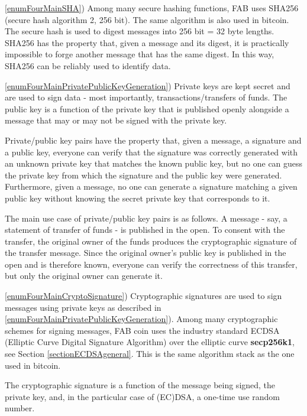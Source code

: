 \documentclass{article}
\newcommand{\secpTwoFiveSixKone}{{\bf secp256k1}}
\begin{document}
\noindent\ref{enumFourMainSHA}) Among many secure hashing functions, FAB uses SHA256 (secure hash algorithm 2, 256 bit). The same algorithm is also used in bitcoin. The secure hash is used to digest messages into 256 bit = 32 byte lengths. SHA256 has the property that, given a message and its digest, it is practically impossible to forge another message that has the same digest. 
In this way, SHA256 can be reliably used to identify data. 

\noindent\ref{enumFourMainPrivatePublicKeyGeneration}) Private keys are kept secret and are used to sign data - most importantly, transactions/transfers of funds. The public key is a function of the private key that is published openly alongside a message that may or may not be signed with the private key. 

Private/public key pairs have the property that, given a message, a signature and a public key, everyone can verify that the signature was correctly generated with an unknown private key that matches the known public key, but no one can guess the private key from which the signature and the public key were generated. Furthermore, given a message, no one can generate a signature matching a given public key without knowing the secret private key that corresponds to it.

The main use case of private/public key pairs is as follows. A message - say, a statement of transfer of funds - is published in the open. To consent with the transfer, the original owner of the funds produces the cryptographic signature of the transfer message. Since the original owner's public key is published in the open and is therefore known, everyone can verify the correctness of this transfer, but only the original owner can generate it.

\noindent\ref{enumFourMainCryptoSignature}) Cryptographic signatures are used to sign messages using private keys as described in \ref{enumFourMainPrivatePublicKeyGeneration}). Among many cryptographic schemes for signing messages, FAB coin uses the industry standard ECDSA (Elliptic Curve Digital Signature Algorithm) over the elliptic curve \secpTwoFiveSixKone, see Section \ref{sectionECDSAgeneral}. This is the same algorithm stack as the one used in bitcoin.

The cryptographic signature is a function of the message being signed, the private key, and, in the particular case of (EC)DSA, a one-time use random number.
\end{document}
